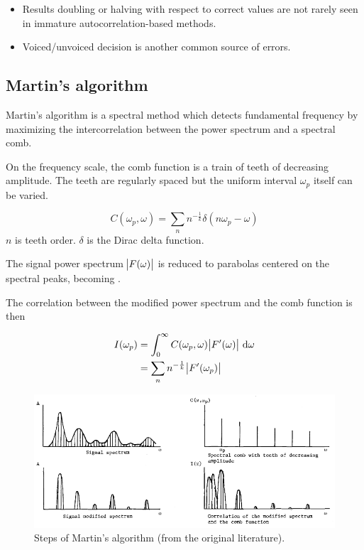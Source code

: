 \documentclass[11pt,a4paper]{report}
\begin{document}
\begin{itemize}
  \item Results doubling or halving with respect to correct values are not rarely seen in immature autocorrelation-based methods.
  \item Voiced/unvoiced decision is another common source of errors.
\end{itemize}

\subsection{Martin's algorithm}

Martin's algorithm is a spectral method which detects fundamental frequency by maximizing the intercorrelation between the power spectrum and a spectral comb.

On the frequency scale, the comb function is a train of teeth of decreasing amplitude.
The teeth are regularly spaced but the uniform interval \(\omega_p\) itself can be varied.

\begin{equation}
  C(\omega_p, \omega) = \sum_n n^{-\frac{1}{k}} \delta (n \omega_p - \omega)
\end{equation}
\(n\) is teeth order.
\(\delta\) is the Dirac delta function.

The signal power spectrum \(\abs{F(\omega)}\) is reduced to parabolas centered on the spectral peaks, becoming .

The correlation between the modified power spectrum and the comb function is then

\begin{equation}
  \begin{split}
    I (\omega_p) & = \int_{0}^{\infty} C(\omega_p, \omega) \abs{F'(\omega)} \, \mathrm{d} \omega \\
      & = \sum_n n^{-\frac{1}{k}} \abs{F'(\omega_p)}
  \end{split}
\end{equation}

\begin{figure}[htbp]
  \centering
  \includegraphics[width=\textwidth]{martin-algo.png}
  \caption{Steps of Martin's algorithm (from the original literature).} \label{fig:martin-algo}
\end{figure}
\end{document}
